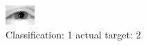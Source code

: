 \begin{figure}[h!]
\begin{center}
\includegraphics[width=0.60\columnwidth]{figures/ID2350_class_1_target_2.png}
\end{center}
\caption{ Classification: 1 actual target: 2}
\label{fig:ID2350_class_1_target_2}
\end{figure}
